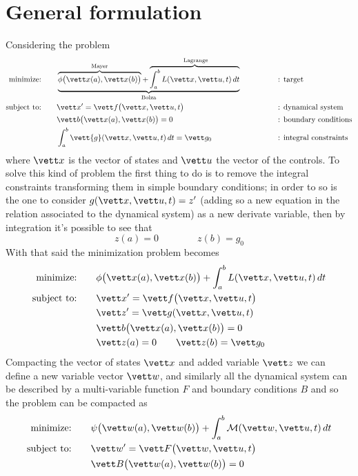 \section{General formulation}
	Considering the problem
	\begin{align*}
		\textrm{minimize:} \qquad & \underbrace{ \overbrace{ \phi\big(\vett x(a), \vett x(b)\big)}^\textrm{Mayer} + \overbrace{\int_a^b  L (\vett x, \vett u,t)\, dt}^\textrm{ Lagrange}}_\textrm{Bolza} \qquad \qquad && \textrm{: target} \\
		\textrm{subject to:} \qquad & \vett x' = \vett f\big(\vett x,\vett u,t\big)  && \textrm{: dynamical system} \\
		& \vett b\big(\vett x(a),\vett x(b)\big) = 0 && \textrm{: boundary conditions} \\
		& \int_a^b \vett{g}(\vett x,\vett u,  t)\, dt = \vett g_0 && \textrm{: integral constraints}
	\end{align*}
	where $\vett x$ is the vector of states and $\vett u$ the vector of the controls. To solve this kind of problem the first thing to do is to remove the integral constraints transforming them in simple boundary conditions; in order to so is the one to consider $g(\vett x,\vett u,t) = z'$  (adding so a new equation in the relation associated to the dynamical system) as a new derivate variable, then by integration it's possible to see that
	\[ z(a) = 0 \qquad \qquad z(b) = g_0 \]
	With that said the minimization problem becomes
	\begin{align*}
		\textrm{minimize:} \qquad & \phi\big(\vett x(a), \vett x(b)\big) + \int_a^b  L (\vett x, \vett u,t)\, dt  \\
		\textrm{subject to:} \qquad & \vett x' = \vett f\big(\vett x,\vett u,t\big)   \\
		& \vett z' = \vett g(\vett x, \vett u, t) \\
		& \vett b\big(\vett x(a),\vett x(b)\big) = 0 \\
		& \vett z(a) = 0 \qquad \vett z(b) = \vett g_0
	\end{align*}
	Compacting the vector of states $\vett x$ and added variable $\vett z$ we can define a new variable vector $\vett w$, and similarly all the dynamical system can be described by a multi-variable function $F$ and boundary conditions $B$ and so the problem can be compacted as
	\begin{align*}
		\textrm{minimize:} \qquad & \psi\big(\vett w(a), \vett w(b)\big) + \int_a^b \mathcal M(\vett w, \vett u,t)\, dt  \\
		\textrm{subject to:} \qquad & \vett w' = \vett F\big(\vett w,\vett u,t\big)   \\
		& \vett B\big(\vett w(a),\vett w(b)\big) = 0 
	\end{align*}
	
